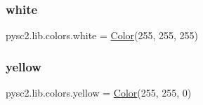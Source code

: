 \subsubsection{\texorpdfstring{white}{white}}
{\footnotesize\ttfamily pysc2.\+lib.\+colors.\+white = \mbox{\hyperlink{classpysc2_1_1lib_1_1colors_1_1_color}{Color}}(255, 255, 255)}

\mbox{\label{namespacepysc2_1_1lib_1_1colors_a9e788f470ae13da2f10d00cf3e541964}} 
\subsubsection{\texorpdfstring{yellow}{yellow}}
{\footnotesize\ttfamily pysc2.\+lib.\+colors.\+yellow = \mbox{\hyperlink{classpysc2_1_1lib_1_1colors_1_1_color}{Color}}(255, 255, 0)}

